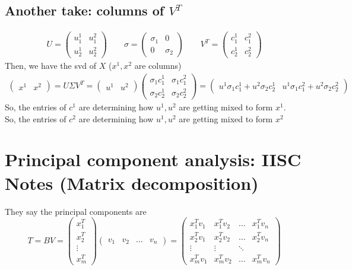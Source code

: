 \documentclass{article}
\newcommand{\beq}{\begin{equation}}
\newcommand{\eeq}{\end{equation}}
\newcommand{\ber}{\begin{eqnarray}}
\newcommand{\eer}{\end{eqnarray}}
\begin{document}
\subsection{Another take: columns of $V^T$}
\ber
U =
\begin{pmatrix}
  u^1_1 & u^2_1\\
  u^1_2 & u^2_2
\end{pmatrix}
\qquad
\sigma=
\begin{pmatrix}
  \sigma_1 & 0 \\
  0   &  \sigma_2 
\end{pmatrix}  
\qquad
V^T =
\begin{pmatrix}
  c^1_1 & c^2_1\\
  c^1_2 & c^2_2
\end{pmatrix} 
\eer
Then, we have the svd of $X$ ($x^1,x^2$ are columns)
\ber
\begin{pmatrix}
  x^1 & x^2
\end{pmatrix}
=
U\Sigma{}V^T =
\begin{pmatrix}
u^1 & u^2   
\end{pmatrix}
\begin{pmatrix}
  \sigma_1 c^1_1 & \sigma_1 c^2_1\\
  \sigma_2 c^1_2 & \sigma_2 c^2_2
\end{pmatrix}
=
\begin{pmatrix}
  u^1\sigma_1c^1_1 + u^2\sigma_2c^1_2  & u^1\sigma_1c^2_1 + u^2\sigma_2c^2_2
\end{pmatrix}  
\eer
So, the entries of $c^1$ are determining how $u^1,u^2$ are getting mixed to form  $x^1$. \\
So, the entries of $c^2$ are determining how $u^1,u^2$ are getting mixed to form  $x^2$
%
%
%
\section{Principal component analysis: IISC Notes (Matrix decomposition)}

They say the principal components are
\beq
T = BV =
\begin{pmatrix}
  x_{1}^T\\
  x_{2}^{T}\\
  \vdots\\
  x_{m}^T
\end{pmatrix}
\begin{pmatrix}
  v_1 & v_2 & \hdots & v_n
\end{pmatrix}
=
\begin{pmatrix}
  x_1^Tv_1 & x_1^Tv_2 & \hdots & x_1^Tv_n\\
  x_2^Tv_1 & x_2^Tv_2 & \hdots & x_2^Tv_n\\
  \vdots & \vdots &  \ddots &  \\
  x_m^Tv_1 & x_m^Tv_2 & \hdots & x_m^Tv_n
\end{pmatrix}  
\eeq
%
%
%
\end{document}
